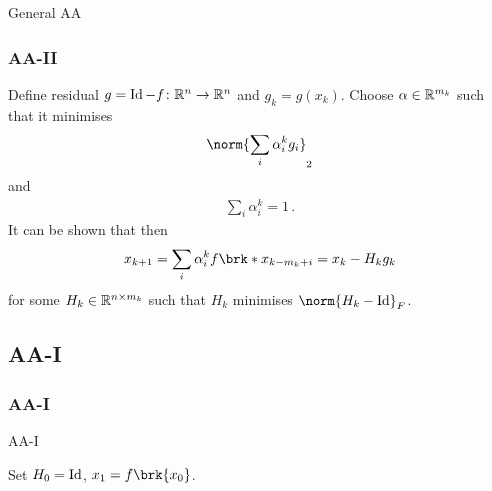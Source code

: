 \begin{frame}
	\begin{algorithm}[H]
	\caption{General AA}
	\color{gray}
	\BlankLine
	\end{algorithm}
\end{frame}

\begin{frame}
	\frametitle{AA-II}
	Define residual $g=\operatorname{Id}-f\colon\mathbb{R}^n\to\mathbb{R}^n$ and $g_k = g(x_k)$.
	Choose $\alpha\in\mathbb{R}^{m_k}$ such that it minimises
	\begin{align*}
		\norm{\sum_i\alpha^k_ig_i}_2
	\end{align*}
	and
	\begin{align*}
		\sum_i\alpha^k_i = 1\,.
	\end{align*}
	It can be shown that then
	\begin{align*}
		x_{k+1} = \sum_i \alpha_i^kf\brk*{x_{k-m_k+i}} = x_k-H_kg_k
	\end{align*}
	for some $H_k\in\mathbb{R}^{n\times m_k}$ such that $H_k$ minimises $\norm{H_k-\Id}_F$.
\end{frame}


\subsection{AA-I}
\begin{frame}
	\frametitle{AA-I}
\end{frame}

\begin{frame}
	\begin{algorithm}[H]
	\caption{AA-I}
	\color{gray}
	\BlankLine
	Set $H_0=\operatorname{Id}$, $x_1=f\brk{x_0}$.
	
	\end{algorithm}
\end{frame}

